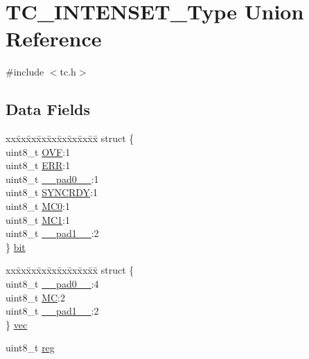 \hypertarget{union_t_c___i_n_t_e_n_s_e_t___type}{}\section{T\+C\+\_\+\+I\+N\+T\+E\+N\+S\+E\+T\+\_\+\+Type Union Reference}
\label{union_t_c___i_n_t_e_n_s_e_t___type}


{\ttfamily \#include $<$tc.\+h$>$}

\subsection*{Data Fields}
\begin{DoxyCompactItemize}
\item 
\begin{tabbing}
xx\=xx\=xx\=xx\=xx\=xx\=xx\=xx\=xx\=\kill
struct \{\\
\>uint8\_t \mbox{\hyperlink{union_t_c___i_n_t_e_n_s_e_t___type_ac6a3a2f132415ccc7b2b360497b74b15}{OVF}}:1\\
\>uint8\_t \mbox{\hyperlink{union_t_c___i_n_t_e_n_s_e_t___type_afb74dff3cfacd68c02883e5282ef2f59}{ERR}}:1\\
\>uint8\_t \mbox{\hyperlink{union_t_c___i_n_t_e_n_s_e_t___type_a8b4eebe79ded0459acec2f4950102ba3}{\_\_pad0\_\_}}:1\\
\>uint8\_t \mbox{\hyperlink{union_t_c___i_n_t_e_n_s_e_t___type_aece75e176e4fd55bf68937f1b56bde63}{SYNCRDY}}:1\\
\>uint8\_t \mbox{\hyperlink{union_t_c___i_n_t_e_n_s_e_t___type_aa3f4a766aece73b336a8d1e8d7cfd990}{MC0}}:1\\
\>uint8\_t \mbox{\hyperlink{union_t_c___i_n_t_e_n_s_e_t___type_a80173c059eec98f333eb801a1d138a0f}{MC1}}:1\\
\>uint8\_t \mbox{\hyperlink{union_t_c___i_n_t_e_n_s_e_t___type_a77f12d2e278bd5c07712648ac0df5e08}{\_\_pad1\_\_}}:2\\
\} \mbox{\hyperlink{union_t_c___i_n_t_e_n_s_e_t___type_acc8900ca8766e21403cb76459acbbb3d}{bit}}\\

\end{tabbing}\item 
\begin{tabbing}
xx\=xx\=xx\=xx\=xx\=xx\=xx\=xx\=xx\=\kill
struct \{\\
\>uint8\_t \mbox{\hyperlink{union_t_c___i_n_t_e_n_s_e_t___type_a8b4eebe79ded0459acec2f4950102ba3}{\_\_pad0\_\_}}:4\\
\>uint8\_t \mbox{\hyperlink{union_t_c___i_n_t_e_n_s_e_t___type_a68b0dfa25e78af97366bc6f33149e009}{MC}}:2\\
\>uint8\_t \mbox{\hyperlink{union_t_c___i_n_t_e_n_s_e_t___type_a77f12d2e278bd5c07712648ac0df5e08}{\_\_pad1\_\_}}:2\\
\} \mbox{\hyperlink{union_t_c___i_n_t_e_n_s_e_t___type_a014f8b210bd8ef90828fdbb7df2c874c}{vec}}\\

\end{tabbing}\item 
uint8\+\_\+t \mbox{\hyperlink{union_t_c___i_n_t_e_n_s_e_t___type_a9428adc9af4653a2050e2536b55dec8d}{reg}}
\end{DoxyCompactItemize}


